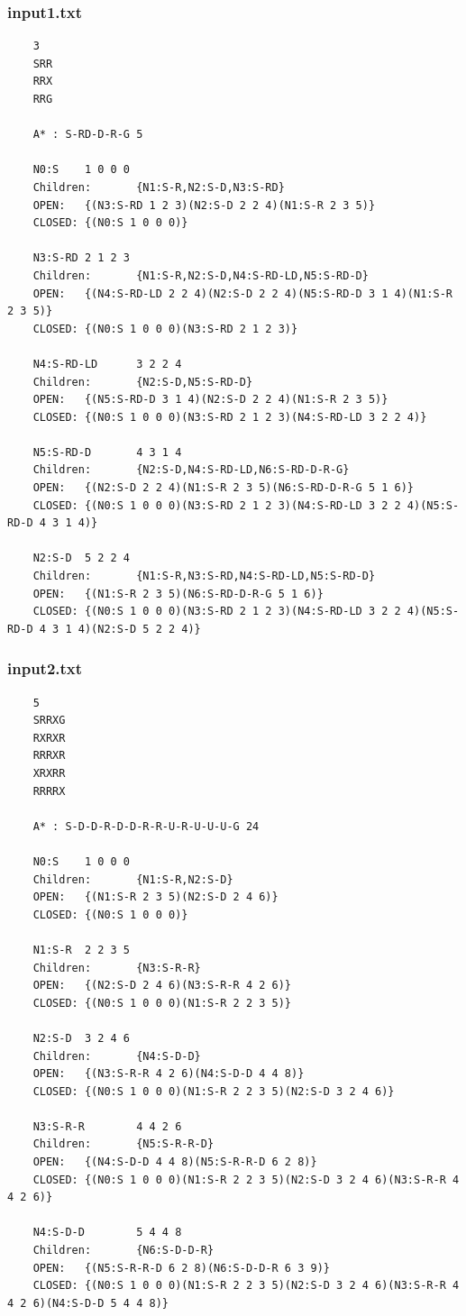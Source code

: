\documentclass{article}
\begin{document}
	\subsubsection{input1.txt}
	\begin{lstlisting}
	3
	SRR
	RRX
	RRG
	
	A* : S-RD-D-R-G 5
	
	N0:S    1 0 0 0
	Children:       {N1:S-R,N2:S-D,N3:S-RD}
	OPEN:   {(N3:S-RD 1 2 3)(N2:S-D 2 2 4)(N1:S-R 2 3 5)}
	CLOSED: {(N0:S 1 0 0 0)}
	
	N3:S-RD 2 1 2 3
	Children:       {N1:S-R,N2:S-D,N4:S-RD-LD,N5:S-RD-D}
	OPEN:   {(N4:S-RD-LD 2 2 4)(N2:S-D 2 2 4)(N5:S-RD-D 3 1 4)(N1:S-R 2 3 5)}
	CLOSED: {(N0:S 1 0 0 0)(N3:S-RD 2 1 2 3)}
	
	N4:S-RD-LD      3 2 2 4
	Children:       {N2:S-D,N5:S-RD-D}
	OPEN:   {(N5:S-RD-D 3 1 4)(N2:S-D 2 2 4)(N1:S-R 2 3 5)}
	CLOSED: {(N0:S 1 0 0 0)(N3:S-RD 2 1 2 3)(N4:S-RD-LD 3 2 2 4)}
	
	N5:S-RD-D       4 3 1 4
	Children:       {N2:S-D,N4:S-RD-LD,N6:S-RD-D-R-G}
	OPEN:   {(N2:S-D 2 2 4)(N1:S-R 2 3 5)(N6:S-RD-D-R-G 5 1 6)}
	CLOSED: {(N0:S 1 0 0 0)(N3:S-RD 2 1 2 3)(N4:S-RD-LD 3 2 2 4)(N5:S-RD-D 4 3 1 4)}
	
	N2:S-D  5 2 2 4
	Children:       {N1:S-R,N3:S-RD,N4:S-RD-LD,N5:S-RD-D}
	OPEN:   {(N1:S-R 2 3 5)(N6:S-RD-D-R-G 5 1 6)}
	CLOSED: {(N0:S 1 0 0 0)(N3:S-RD 2 1 2 3)(N4:S-RD-LD 3 2 2 4)(N5:S-RD-D 4 3 1 4)(N2:S-D 5 2 2 4)}

	\end{lstlisting}
	\newpage
	\subsubsection{input2.txt}
	\begin{lstlisting}
	5
	SRRXG
	RXRXR
	RRRXR
	XRXRR
	RRRRX
	
	A* : S-D-D-R-D-D-R-R-U-R-U-U-U-G 24
	
	N0:S    1 0 0 0
	Children:       {N1:S-R,N2:S-D}
	OPEN:   {(N1:S-R 2 3 5)(N2:S-D 2 4 6)}
	CLOSED: {(N0:S 1 0 0 0)}
	
	N1:S-R  2 2 3 5
	Children:       {N3:S-R-R}
	OPEN:   {(N2:S-D 2 4 6)(N3:S-R-R 4 2 6)}
	CLOSED: {(N0:S 1 0 0 0)(N1:S-R 2 2 3 5)}
	
	N2:S-D  3 2 4 6
	Children:       {N4:S-D-D}
	OPEN:   {(N3:S-R-R 4 2 6)(N4:S-D-D 4 4 8)}
	CLOSED: {(N0:S 1 0 0 0)(N1:S-R 2 2 3 5)(N2:S-D 3 2 4 6)}
	
	N3:S-R-R        4 4 2 6
	Children:       {N5:S-R-R-D}
	OPEN:   {(N4:S-D-D 4 4 8)(N5:S-R-R-D 6 2 8)}
	CLOSED: {(N0:S 1 0 0 0)(N1:S-R 2 2 3 5)(N2:S-D 3 2 4 6)(N3:S-R-R 4 4 2 6)}
	
	N4:S-D-D        5 4 4 8
	Children:       {N6:S-D-D-R}
	OPEN:   {(N5:S-R-R-D 6 2 8)(N6:S-D-D-R 6 3 9)}
	CLOSED: {(N0:S 1 0 0 0)(N1:S-R 2 2 3 5)(N2:S-D 3 2 4 6)(N3:S-R-R 4 4 2 6)(N4:S-D-D 5 4 4 8)}
	
	
	\end{lstlisting}
	\newpage
\end{document}
